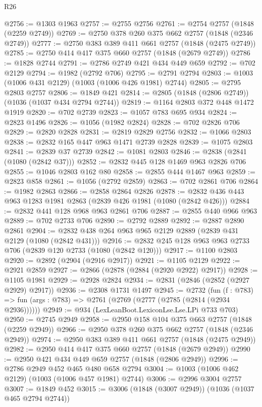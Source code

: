 \begin{lexlean}{R26}
\begin{coremodule}
@2756 := @1303 @1963
@2757 := @2755 @2756
@2761 := @2754 @2757 (@1848 (@2259 @2749))
@2769 := @2750 @378 @260 @375 @662 @2757 (@1848 (@2346 @2749))
@2777 := @2750 @383 @389 @411 @661 @2757 (@1848 (@2475 @2749))
@2785 := @2750 @414 @417 @375 @660 @2757 (@1848 (@2679 @2749))
@2786 := @1828 @2744
@2791 := @2786 @2749 @421 @434 @449 @659
@2792 := @702 @2129
@2794 := @1982 (@2792 @706)
@2795 := @2791 @2794
@2803 := @1003 (@1006 @431 @2129) (@1003 (@1006 @426 @1981) @2744)
@2805 := @2795 @2803 @2757
@2806 := @1849 @421
@2814 := @2805 (@1848 (@2806 @2749)) (@1036 (@1037 @434 @2794 @2744))
@2819 := @1164 @2803 @372 @448 @1472 @1919
@2820 := @702 @2739
@2823 := @1057 @783 @695 @934
@2824 := @2823 @1496
@2826 := @1056 (@1982 @2824)
@2828 := @702 @2826 @706
@2829 := @2820 @2828
@2831 := @2819 @2829 @2756
@2832 := @1066 @2803
@2838 := @2832 @165 @447 @963 @1471 @2739 @2828
@2839 := @1075 @2803
@2841 := @2839 @37 @2739
@2842 := @1081 @2803
@2846 := @2838 (@2841 (@1080 (@2842 @37)))
@2852 := @2832 @445 @128 @1469 @963 @2826 @706
@2855 := @1046 @2803 @162 @80
@2858 := @2855 @444 @1467 @963
@2859 := @2823 @858
@2861 := @1056 (@2792 @2859)
@2863 := @702 @2861 @706
@2864 := @1982 @2863
@2866 := @2858 @2864 @2826
@2878 := @2832 @436 @443 @963 @1283 @1981 @2863 (@2839 @426 @1981 (@1080 (@2842 @426)))
@2884 := @2832 @441 @128 @968 @963 @2861 @706
@2887 := @2855 @440 @966 @963
@2889 := @702 @2733 @706
@2890 := @2792 @2889
@2892 := @2887 @2890 @2861
@2904 := @2832 @438 @264 @963 @965 @2129 @2889 (@2839 @431 @2129 (@1080 (@2842 @431)))
@2916 := @2832 @245 @128 @963 @963 @2733 @706 (@2839 @120 @2733 (@1080 (@2842 @120)))
@2917 := @1100 @2803
@2920 := @2892 (@2904 (@2916 @2917))
@2921 := @1105 @2129
@2922 := @2921 @2859
@2927 := @2866 (@2878 (@2884 (@2920 @2922) @2917))
@2928 := @1105 @1981
@2929 := @2928 @2824
@2934 := @2831 (@2846 (@2852 (@2927 @2929) @2917))
@2936 := @2308 @1731 @1497
@2945 := @2732
    (fun (f : @783) => fun (args : @783) => @2761 (@2769 (@2777 (@2785 (@2814 (@2934 @2936))))))
@2949 := @934 (LexLeanBoot.LexiconLse.Lse.LPi @733 @703)
@2950 := @2745 @2949
@2958 := @2950 @158 @104 @375 @663 @2757 (@1848 (@2259 @2949))
@2966 := @2950 @378 @260 @375 @662 @2757 (@1848 (@2346 @2949))
@2974 := @2950 @383 @389 @411 @661 @2757 (@1848 (@2475 @2949))
@2982 := @2950 @414 @417 @375 @660 @2757 (@1848 (@2679 @2949))
@2990 := @2950 @421 @434 @449 @659 @2757 (@1848 (@2806 @2949))
@2996 := @2786 @2949 @452 @465 @480 @658 @2794
@3004 := @1003 (@1006 @462 @2129) (@1003 (@1006 @457 @1981) @2744)
@3006 := @2996 @3004 @2757
@3007 := @1849 @452
@3015 := @3006 (@1848 (@3007 @2949)) (@1036 (@1037 @465 @2794 @2744))

\end{coremodule}
\end{lexlean}
